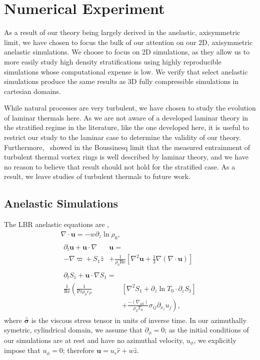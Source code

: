 \documentclass[twocolumn, amsmath, amsfonts, amssymb, trackchanges]{aastex62}
\newcommand{\DivU}{\ensuremath{\nabla\cdot\bm{u}}}
\newcommand{\grad}{\ensuremath{\nabla}}
\newcommand{\lilstressT}{\ensuremath{\bm{\bar{\bar{\sigma}}}}}
\newcommand{\LJ}{\citetalias{lecoanet&jeevanjee2018}}
\begin{document}
\section{Numerical Experiment} 
\label{sec:experiment}
As a result of our theory being largely derived in the anelastic, axisymmetric limit, we have chosen to focus the bulk of our attention on our 2D, axisymmetric anelastic simulations.
We choose to focus on 2D simulations, as they allow us to more easily study high density stratifications using highly reproducible simulations whose computational expense is low.
We verify that select anelastic simulations produce the same results as 3D fully compressible simulations in cartesian domains. 

While natural processes are very turbulent, we have chosen to study the evolution of laminar thermals here. 
As we are not aware of a developed laminar theory in the stratified regime in the literature, like the one developed here, it is useful to restrict our study to the laminar case to determine the validity of our theory.
Furthermore, \LJ\, showed in the Boussinesq limit that the measured entrainment of turbulent thermal vortex rings is well described by laminar theory, and we have no reason to believe that result should not hold for the stratified case.
As a result, we leave studies of turbulent thermals to future work.

\subsection{Anelastic Simulations}
The LBR anelastic equations are \citep{lecoanet&all2014},
\begin{gather}
\DivU = -w \partial_z \ln\rho_0, \\
\begin{split}
\partial_t \bm{u} + \bm{u}\cdot\grad&\bm{u} = \\
- \grad \varpi + S_1\hat{z} &
+ \frac{1}{\rho_0\text{Re}}\left[\grad^2 \bm{u} + \frac{1}{3}\grad(\DivU)\right] 
\end{split}\\
\begin{split}
\partial_t S_1 + \bm{u}\cdot\grad S_1 =& \\
\frac{1}{\text{Re}}\left(\frac{1}{\text{Pr}\rho_0c_P }\right.&[\grad^2 S_1 + \partial_z\ln T_0 \cdot\partial_z S_1]\\
&+ \left.\frac{-(\grad_{\text{ad}})}{\rho_0 T_0}\sigma_{ij}\partial_{x_i}u_j \right),
\end{split}
\end{gather}
where $\lilstressT$ is the viscous stress tensor in units of inverse time.
In our azimuthally symetric, cylindrical domain, we assume that $\partial_\phi = 0$; as the initial conditions of our simulations are at rest and have no azimuthal velocity, $u_\phi$, we explicitly impose that $u_\phi = 0$; therefore $\bm{u} = u_r \hat{r} + w\hat{z}$. 
\end{document}
